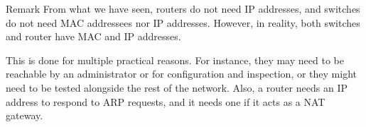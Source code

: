 \documentclass[a4paper]{article}
\begin{document}
\begin{parag}{Remark}
    From what we have seen, routers do not need IP addresses, and switches do not need MAC addressees nor IP addresses. However, in reality, both switches and router have MAC and IP addresses.

    This is done for multiple practical reasons. For instance, they may need to be reachable by an administrator or for configuration and inspection, or they might need to be tested alongside the rest of the network. Also, a router needs an IP address to respond to ARP requests, and it needs one if it acts as a NAT gateway.
\end{parag}
\end{document}

